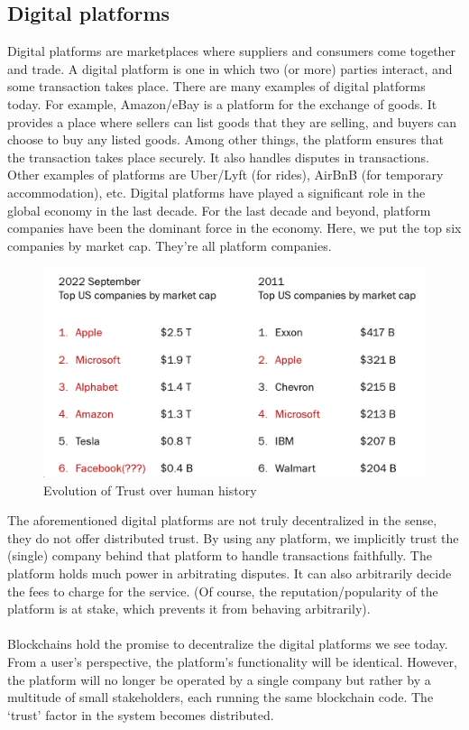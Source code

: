 \subsection*{Digital platforms}
Digital platforms are marketplaces where suppliers and consumers come together and trade. A digital platform is one in which two (or more) parties interact, and some transaction takes place. There are many examples of digital platforms today. For example, Amazon/eBay is a platform for the exchange of goods. It provides a place where sellers can list goods that they are selling, and buyers can choose to buy any listed goods. Among other things, the
platform ensures that the transaction takes place securely. It also handles disputes in transactions. Other examples of platforms are Uber/Lyft (for rides), AirBnB (for temporary accommodation), etc. Digital platforms have played a significant role in the global economy in the last decade. For the last decade and beyond, platform companies have been the dominant force in the economy. Here, we put the top six companies by market cap. They're all platform companies. 
\begin{figure}[h!]
    \centering
    \includegraphics[width=0.7\linewidth]{Fig/01/F4}
    \caption{Evolution of Trust over human history}
    \label{fig:f4}
\end{figure}    
The aforementioned digital platforms are not truly decentralized in the sense, they do not offer distributed trust. By using any platform, we implicitly trust the (single) company behind that platform to handle transactions faithfully. The platform holds much power in arbitrating disputes. It can also arbitrarily decide the fees to charge for the service. (Of course, the reputation/popularity of the platform is at stake, which prevents it from behaving arbitrarily).\\\\
Blockchains hold the promise to decentralize the digital platforms we see today. From a user’s perspective, the platform’s functionality will be identical. However, the platform will no longer be operated by a single company but rather by a multitude of small stakeholders, each running the same blockchain code. The ‘trust’ factor in the system becomes distributed.

